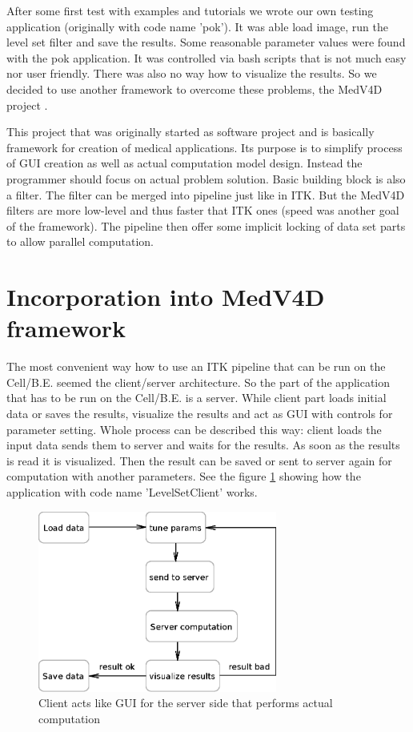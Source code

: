 \par
After some first test with examples and tutorials we wrote our own testing application (originally with code name 'pok').
It was able load image, run the level set filter and save the results.
Some reasonable parameter values were found with the pok application.
It was controlled via bash scripts that is not much easy nor user friendly.
There was also no way how to visualize the results.
So we decided to use another framework to overcome these problems, the MedV4D project \cite{medved}.

\par
This project that was originally started as software project and is basically framework for creation of medical applications.
Its purpose is to simplify process of GUI creation as well as actual computation model design.
Instead the programmer should focus on actual problem solution.
Basic building block is also a filter.
The filter can be merged into pipeline just like in ITK.
But the MedV4D filters are more low-level and thus faster that ITK ones (speed was another goal of the framework).
The pipeline then offer some implicit locking of data set parts to allow parallel computation.

\section{Incorporation into MedV4D framework}

\par
The most convenient way how to use an ITK pipeline that can be run on the \mbox{Cell/B.E.} seemed the client/server architecture.
So the part of the application that has to be run on the \mbox{Cell/B.E.} is a server.
While client part loads initial data or saves the results, visualize the results and act as GUI with controls for parameter setting.
Whole process can be described this way: client loads the input data sends them to server and waits for the results.
As soon as the results is read it is visualized.
Then the result can be saved or sent to server again for computation with another parameters.
See the figure \ref{fg:computationProcess} showing how the application with code name 'LevelSetClient' works.

\begin{figure}
    \centering
    \includegraphics[width=0.7\textwidth]{data/computationProcess}
    \caption[LevelSetClient application computation process]{Client acts like GUI for the server side that performs actual computation}
    \label{fg:computationProcess}
\end{figure}

